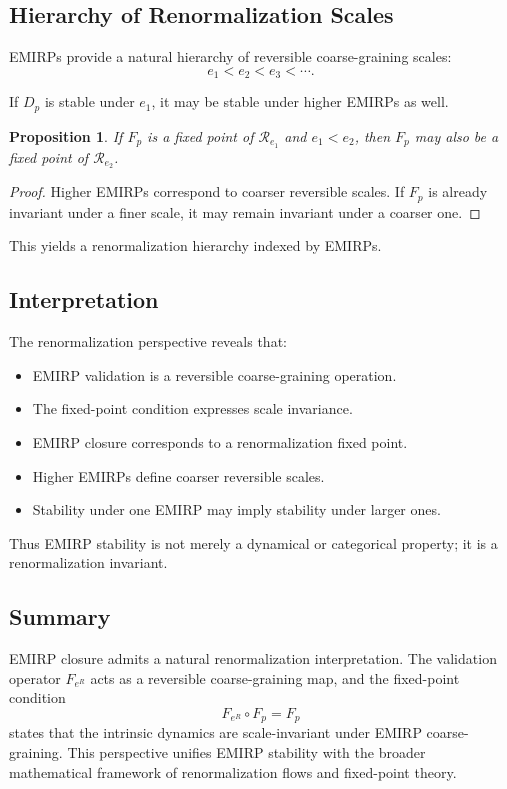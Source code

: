 \documentclass[11pt]{article}
\theoremstyle{definition}
\theoremstyle{plain}
\newtheorem{proposition}[definition]{Proposition}
\theoremstyle{remark}
\begin{document}
\subsection{Hierarchy of Renormalization Scales}

EMIRPs provide a natural hierarchy of reversible coarse-graining scales:
\[
e_1 < e_2 < e_3 < \cdots.
\]

If $D_p$ is stable under $e_1$, it may be stable under higher EMIRPs as
well.

\begin{proposition}
If $F_p$ is a fixed point of $\mathcal{R}_{e_1}$ and $e_1 < e_2$, then
$F_p$ may also be a fixed point of $\mathcal{R}_{e_2}$.
\end{proposition}

\begin{proof}
Higher EMIRPs correspond to coarser reversible scales. If $F_p$ is
already invariant under a finer scale, it may remain invariant under a
coarser one.
\end{proof}

This yields a renormalization hierarchy indexed by EMIRPs.

\subsection{Interpretation}

The renormalization perspective reveals that:

\begin{itemize}
    \item EMIRP validation is a reversible coarse-graining operation.
    \item The fixed-point condition expresses scale invariance.
    \item EMIRP closure corresponds to a renormalization fixed point.
    \item Higher EMIRPs define coarser reversible scales.
    \item Stability under one EMIRP may imply stability under larger ones.
\end{itemize}

Thus EMIRP stability is not merely a dynamical or categorical property;
it is a renormalization invariant.

\subsection{Summary}

EMIRP closure admits a natural renormalization interpretation. The
validation operator $F_{e^R}$ acts as a reversible coarse-graining map,
and the fixed-point condition
\[
F_{e^R} \circ F_p = F_p
\]
states that the intrinsic dynamics are scale-invariant under EMIRP
coarse-graining. This perspective unifies EMIRP stability with the
broader mathematical framework of renormalization flows and fixed-point
theory.
\end{document}
